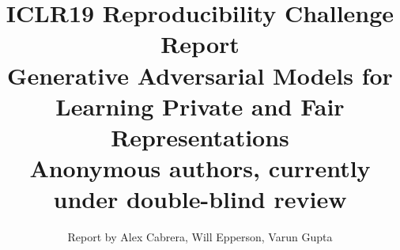 \documentclass{article}
\begin{document}
\title{
ICLR19 Reproducibility Challenge Report \\ \large
\bigskip
Generative Adversarial Models for Learning Private and Fair Representations \\
Anonymous authors, currently under double-blind review}
\author{Report by Alex Cabrera, Will Epperson, Varun Gupta}
\maketitle

\end{document}

